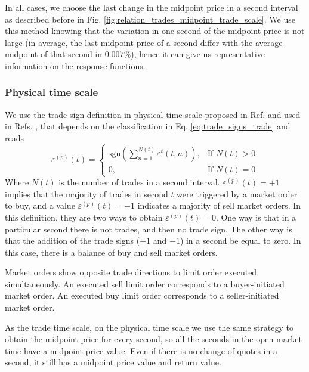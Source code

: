 In all cases, we choose the last change in the midpoint price in a second
interval as described before in Fig.
\ref{fig:relation_trades_midpoint_trade_scale}. We use this method knowing that
the variation in one second of the midpoint price is not large (in average, the
last midpoint price of a second differ with the average midpoint of that second
in $0.007\%$), hence it can give us representative information on the response
functions.

\subsubsection*{Physical time scale}\label{subsubsec:physical_time}

We use the trade sign definition in physical time scale proposed in Ref.
\cite{Wang_2016_cross} and used in Refs.
\cite{Wang_2017,Wang_2016_avg}, that depends on the classification in
Eq. \ref{eq:trade_signs_trade} and reads
\begin{equation}\label{eq:trade_signs_physical}
    \varepsilon^{\left(p\right)}\left(t\right)=\left\{
    \begin{array}{cc}
    \text{sgn}\left(\sum_{n=1}^{N\left(t\right)}\varepsilon^{t}
    \left(t,n\right)\right),
    & \text{If }N \left(t\right)>0\\
    0, & \text{If }N\left(t\right)=0
    \end{array}\right.
\end{equation}
Where $N \left(t \right)$ is the number of trades in a second interval.
$\varepsilon^{\left(p\right)}\left( t \right) = +1$ implies that the majority
of trades in second $t$ were triggered by a market order to buy, and a value
$\varepsilon^{\left(p\right)}\left( t \right) = -1$ indicates a majority of
sell market orders. In this definition, they are two ways to obtain
$\varepsilon^{\left(p\right)}\left( t \right) = 0$. One way is that in a
particular second there is not trades, and then no trade sign. The other way is
that the addition of the trade signs ($+1$ and $-1$) in a second be equal to
zero. In this case, there is a balance of buy and sell market orders.

Market orders show opposite trade directions to limit order executed
simultaneously. An executed sell limit order corresponds to a buyer-initiated
market order. An executed buy limit order corresponds to a seller-initiated
market order.

As the trade time scale, on the physical time scale we use the same strategy
to obtain the midpoint price for every second, so all the seconds in the open
market time have a midpoint price value. Even if there is no change of quotes
in a second, it still has a midpoint price value and return value.

